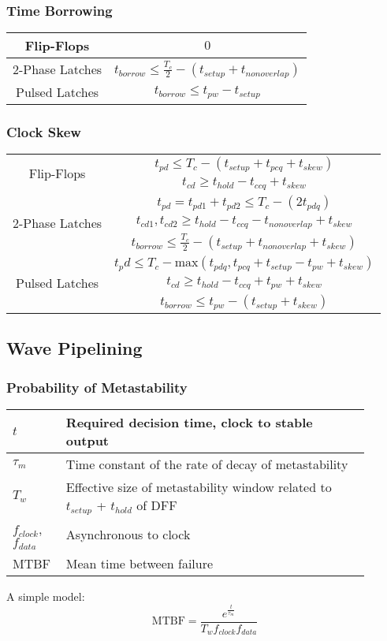     \subsubsection{Time Borrowing}
    \begin{tabular}{| c | c |}
        \hline
        Flip-Flops & $0$ \\
        \hline
        2-Phase Latches & $t_{borrow} \leq \frac{T_c}{2} - (t_{setup} + t_{nonoverlap})$ \\
        \hline
        Pulsed Latches & $t_{borrow} \leq t_{pw} - t_{setup}$ \\
        \hline
    \end{tabular}

    \subsubsection{Clock Skew}
    \begin{tabular}{| c | c |}
        \hline
        \multirow{2}{4em}{Flip-Flops} & $t_{pd} \leq T_c - (t_{setup} + t_{pcq} + t_{skew})$ \\
        & $t_{cd} \geq t_{hold} - t_{ccq} + t_{skew}$\\
        \hline
        \multirow{3}{4em}{2-Phase Latches} & $t_{pd} = t_{pd1} + t_{pd2} \leq T_c - (2t_{pdq})$ \\
        & $t_{cd1},t_{cd2} \geq t_{hold} - t_{ccq} - t_{nonoverlap} + t_{skew}$\\
        & $t_{borrow} \leq \frac{T_c}{2} - (t_{setup} + t_{nonoverlap} + t_{skew})$\\
        \hline
        \multirow{3}{4em}{Pulsed Latches} & $t_pd \leq T_c - \text{max}\left( t_{pdq}, t_{pcq} + t_{setup} - t_{pw} + t_{skew}\right)$ \\
        & $t_{cd} \geq t_{hold} - t_{ccq} + t_{pw} + t_{skew}$ \\
        & $t_{borrow} \leq t_{pw} - (t_{setup} +t_{skew})$\\
        \hline
    \end{tabular}
\subsection{Wave Pipelining}
    \subsubsection{Probability of Metastability}
    \begin{tabular}{| p{0.11\linewidth} | p{0.79\linewidth} |}
        \hline
        $t$ & Required decision time, clock to stable output \\
        \hline
        $\tau_m$ & Time constant of the rate of decay of metastability \\
        \hline
        $T_w$ & Effective size of metastability window related to $t_{setup}$ + $t_{hold}$ of DFF \\
        \hline
        $f_{clock}$, $f_{data}$ & Asynchronous to clock \\
        \hline
        MTBF & Mean time between failure\\
        \hline
    \end{tabular}

    A simple model:
    $$\text{MTBF} = \frac{e^{\frac{t}{\tau_m}}}{T_w f_{clock} f_{data}}$$